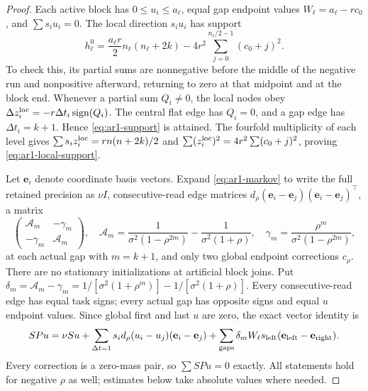 \begin{proof}
Each active block has $0\le u_i\le a_\ell$, equal gap endpoint values
$W_\ell=a_\ell-rc_0$, and $\sum s_i u_i=0$.
The local direction $s_i u_i$ has support
\begin{equation}\label{eq:ar1-local-support}
 h_\ell^0=\frac{a_\ell r}{2}n_\ell(n_\ell+2k)
 -4r^2\sum_{j=0}^{n_\ell/2-1}(c_0+j)^2.
\end{equation}
To check this, its partial sums are nonnegative before the middle of the
negative run and nonpositive afterward, returning to zero at that midpoint
and at the block end. Whenever a partial sum $Q_i\ne0$, the local nodes obey
$\Delta z_i^{\rm loc}=-r\Delta t_i\operatorname{sign}(Q_i)$.
The central flat edge has $Q_i=0$, and a gap edge has $\Delta t_i=k+1$.
Hence \eqref{eq:ar1-support} is attained. The fourfold multiplicity of each
level gives $\sum s_i z_i^{\rm loc}=rn(n+2k)/2$ and
$\sum(z_i^{\rm loc})^2=4r^2\sum(c_0+j)^2$, proving
\eqref{eq:ar1-local-support}.

Let $\mathbf e_i$ denote coordinate basis vectors. Expand
\eqref{eq:ar1-markov} to write the full retained precision as $\nu I$,
consecutive-read edge matrices
$d_\rho(\mathbf e_i-\mathbf e_j)(\mathbf e_i-\mathbf e_j)^\top$, a matrix
\[
 \begin{pmatrix}\mathcal A_m&-\gamma_m\\-\gamma_m&\mathcal A_m\end{pmatrix},\quad
 \mathcal A_m=\frac1{\sigma^2(1-\rho^{2m})}-\frac1{\sigma^2(1+\rho)},\quad
 \gamma_m=\frac{\rho^m}{\sigma^2(1-\rho^{2m})},
\]
at each actual gap with $m=k+1$, and only two global endpoint corrections
$c_\rho$. There are no stationary initializations at artificial block joins.
Put $\delta_m=\mathcal A_m-\gamma_m
=1/[\sigma^2(1+\rho^m)]-1/[\sigma^2(1+\rho)]$.
Every consecutive-read edge has equal task signs; every actual gap has
opposite signs and equal $u$ endpoint values. Since global first and last
$u$ are zero, the exact vector identity is
\begin{equation}\label{eq:ar1-exact-zero-moment}
 SPu=\nu Su+
 \sum_{\Delta t=1}s_i d_\rho(u_i-u_j)(\mathbf e_i-\mathbf e_j)
 +\sum_{\rm gaps}\delta_m W_\ell s_{\rm left}
 (\mathbf e_{\rm left}-\mathbf e_{\rm right}).
\end{equation}
Every correction is a zero-mass pair, so $\sum SPu=0$ exactly.
All statements hold for negative $\rho$ as well; estimates below take
absolute values where needed.


\end{proof}
